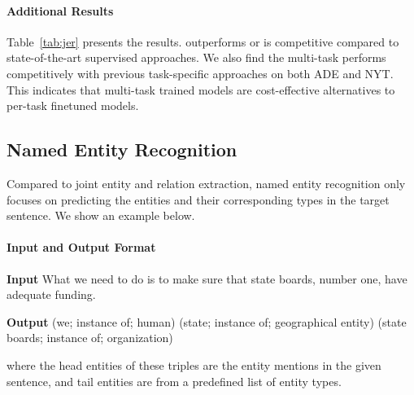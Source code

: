 \paragraph{Additional Results}
Table~\ref{tab:jer} presents the results. \method outperforms or is competitive compared to state-of-the-art supervised approaches. We also find the multi-task \method performs competitively with previous task-specific approaches on both ADE and NYT. This indicates that multi-task trained models are cost-effective alternatives to per-task finetuned models.

\subsection{Named Entity Recognition}
Compared to joint entity and relation extraction, named entity recognition only focuses on predicting the entities and their corresponding types in the target sentence. We show an example below.

\paragraph{Input and Output Format}
\begin{enumerate*}
    \item[] {\bf Input} What we need to do is to make sure that state boards, number one, have adequate funding.
    \item[] {\bf Output} (we; instance of; human) (state; instance of; geographical entity) (state boards; instance of; organization)
\end{enumerate*}

\noindent where the head entities of these triples are the entity mentions in the given sentence, and tail entities are from a predefined list of entity types.


